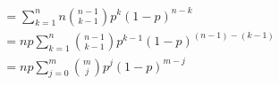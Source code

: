 \documentclass[preview]{standalone}
\begin{document}
\begin{align*}
&= \sum ^{n} _{k=1} n {{n-1}\choose{k-1}} p^{k} (1-p)^{n-k}\\ &= n p \sum ^{n} _{k=1} {{n-1}\choose{k-1}} p^{k-1} (1-p)^{(n-1)-(k-1)}\\ &= n p \sum ^{m} _{j=0} {{m}\choose{j}} p^{j} (1-p)^{m-j}\\
\end{align*}
\end{document}
